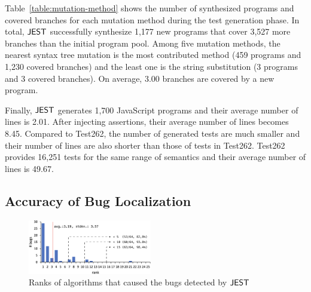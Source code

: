 Table~\ref{table:mutation-method} shows the number of synthesized programs and covered
branches for each mutation method during the test generation phase.  In total,
$\tool$ successfully synthesize 1,177 new programs that cover 3,527
more branches than the initial program pool.  Among five mutation methods, the
nearest syntax tree mutation is the most contributed method (459
programs and 1,230 covered branches) and the least one is the string
substitution (3 programs and 3 covered branches).  On average,
3.00 branches are covered by a new program.

Finally, $\tool$ generates 1,700 JavaScript programs and their average number of
lines is 2.01.  After injecting assertions, their average number of lines
becomes 8.45.  Compared to Test262, the number of generated tests are much
smaller and their number of lines are also shorter than those of tests in
Test262.  Test262 provides 16,251 tests for the same range of semantics and
their average number of lines is 49.67.


\subsection{Accuracy of Bug Localization}

\begin{figure}[t]
  \centering
  \includegraphics[width=0.48\textwidth]{img/localize}
  \caption{Ranks of algorithms that caused the bugs detected by $\tool$}
  \label{fig:localize}
  \vspace*{-1em}
\end{figure}

